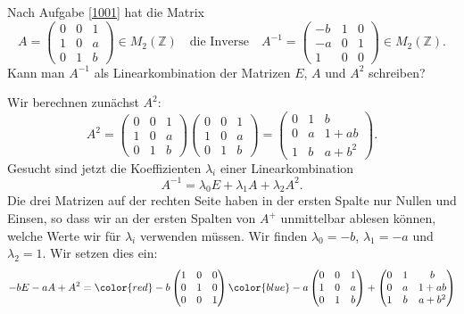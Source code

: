 Nach Aufgabe \ref{1001} hat die Matrix 
\[
A
=
\begin{pmatrix}
0&0&1\\
1&0&a\\
0&1&b
\end{pmatrix}
\in
M_2(\mathbb{Z})
\quad\text{die Inverse}\quad
A^{-1}
=
\begin{pmatrix}
-b&1&0\\
-a&0&1\\
1&0&0
\end{pmatrix}
\in
M_2(\mathbb{Z}).
\]
Kann man $A^{-1}$ als Linearkombination der Matrizen $E$, $A$ und $A^2$
schreiben?

\begin{loesung}
Wir berechnen zunächst $A^2$:
\[
A^2
=
\begin{pmatrix}
0&0&1\\
1&0&a\\
0&1&b
\end{pmatrix}
\begin{pmatrix}
0&0&1\\
1&0&a\\
0&1&b
\end{pmatrix}
=
\begin{pmatrix}
0&1&b\\
0&a&1+ab\\
1&b&a+b^2
\end{pmatrix}.
\]
Gesucht sind jetzt die Koeffizienten
$\lambda_i$ einer Linearkombination
\[
A^{-1} = \lambda_0 E + \lambda_1 A + \lambda_2 A^2.
\]
Die drei Matrizen auf der rechten Seite haben in der ersten
Spalte nur Nullen und Einsen, so dass wir an der ersten Spalten von
$A^{+}$ unmittelbar ablesen können, welche Werte wir für $\lambda_i$
verwenden müssen.
Wir finden $\lambda_0=-b$, $\lambda_1=-a$ und $\lambda_2=1$.
Wir setzen dies ein:
\begin{align*}
-bE-aA+A^2
&=
{\color{red}-b}
\begin{pmatrix}
1&0&0\\
0&1&0\\
0&0&1
\end{pmatrix}
{\color{blue}-a}
\begin{pmatrix}
0&0&1\\
1&0&a\\
0&1&b
\end{pmatrix}
+
\begin{pmatrix}
0&1&b\\
0&a&1+ab\\
1&b&a+b^2
\end{pmatrix}
\\

\end{align*}
\end{loesung}
